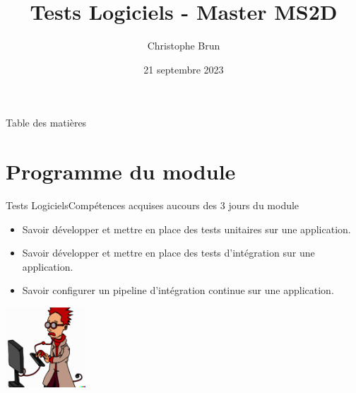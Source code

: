 \documentclass{beamer}
\title{Tests Logiciels - Master MS2D}
\author{Christophe Brun}
\institute{Campus Saint-Michel IT}
\date{21 septembre 2023}
\begin{document}
    \begin{frame}
        \transdissolve
        \titlepage
    \end{frame}

    \begin{frame}{Table des matières}
        \tableofcontents
    \end{frame}


    \section{Programme du module}\label{sec:programme-du-module}
    \begin{frame}{Tests Logiciels}{Compétences acquises aucours des 3 jours du module}
        \transdissolve
        \begin{itemize}
            \item Savoir développer et mettre en place des tests unitaires sur une application.

            \item Savoir développer et mettre en place des tests d’intégration sur une application.

            \item Savoir configurer un pipeline d’intégration continue sur une application.

        \end{itemize}
        \centering
        \includegraphics[width=3cm]{image/funny-cartoon-of-a-smart-young-computer-scientist}
    \end{frame}
\end{document}
